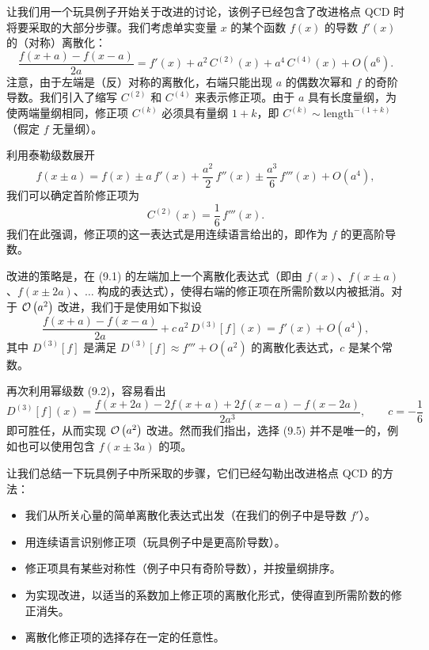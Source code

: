 让我们用一个玩具例子开始关于改进的讨论，该例子已经包含了改进格点 QCD 时将要采取的大部分步骤。我们考虑单实变量 $x$ 的某个函数 $f(x)$ 的导数 $f'(x)$ 的（对称）离散化：
\begin{equation}
  \frac{f(x+a) - f(x-a)}{2a}
  = f'(x) + a^2\,C^{(2)}(x) + a^4\,C^{(4)}(x) + O(a^6) .
\end{equation}
注意，由于左端是（反）对称的离散化，右端只能出现 $a$ 的偶数次幂和 $f$ 的奇阶导数。我们引入了缩写 $C^{(2)}$ 和 $C^{(4)}$ 来表示修正项。由于 $a$ 具有长度量纲，为使两端量纲相同，修正项 $C^{(k)}$ 必须具有量纲 $1+k$，即 $C^{(k)} \sim \mathrm{length}^{-(1+k)}$（假定 $f$ 无量纲）。

利用泰勒级数展开
\begin{equation}
  f(x \pm a) = f(x) \pm a\,f'(x) + \frac{a^2}{2}\,f''(x)
    \pm \frac{a^3}{6}\,f'''(x) + O(a^4) ,
\end{equation}
我们可以确定首阶修正项为
\begin{equation}
  C^{(2)}(x) = \frac{1}{6}\,f'''(x) .
\end{equation}
我们在此强调，修正项的这一表达式是用连续语言给出的，即作为 $f$ 的更高阶导数。

改进的策略是，在 (9.1) 的左端加上一个离散化表达式（即由 $f(x)$、$f(x\pm a)$、$f(x\pm 2a)$、$\ldots$ 构成的表达式），使得右端的修正项在所需阶数以内被抵消。对于 $\mathcal{O}\left(a^2\right)$ 改进，我们于是使用如下拟设
\begin{equation}
  \frac{f(x+a) - f(x-a)}{2a} + c\,a^2\,D^{(3)}[f](x) = f'(x) + O(a^4) ,
\end{equation}
其中 $D^{(3)}[f]$ 是满足 $D^{(3)}[f] \approx f''' + O(a^2)$ 的离散化表达式，$c$ 是某个常数。

再次利用幂级数 (9.2)，容易看出
\begin{equation}
  D^{(3)}[f](x) = \frac{f(x+2a) - 2f(x+a) + 2f(x-a) - f(x-2a)}{2a^3} ,
  \qquad c = -\frac{1}{6}
\end{equation}
即可胜任，从而实现 $\mathcal{O}\left(a^2\right)$ 改进。然而我们指出，选择 (9.5) 并不是唯一的，例如也可以使用包含 $f(x\pm 3a)$ 的项。

让我们总结一下玩具例子中所采取的步骤，它们已经勾勒出改进格点 QCD 的方法：
\begin{itemize}
  \item 我们从所关心量的简单离散化表达式出发（在我们的例子中是导数 $f'$）。
  \item 用连续语言识别修正项（玩具例子中是更高阶导数）。
  \item 修正项具有某些对称性（例子中只有奇阶导数），并按量纲排序。
  \item 为实现改进，以适当的系数加上修正项的离散化形式，使得直到所需阶数的修正消失。
  \item 离散化修正项的选择存在一定的任意性。
\end{itemize}

